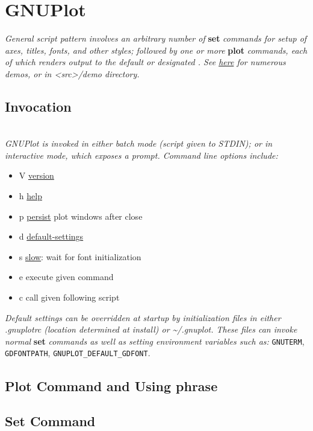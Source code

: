 \section{GNUPlot}
\textit{General script pattern involves an arbitrary number of }\textbf{set}\textit{ commands for setup of axes, titles, fonts, and other styles; followed by one or more }\textbf{plot}\textit{ commands, each of which renders output to the default or designated . See \href{http://gnuplot.info/demos/}{here} for numerous demos, or in <src>/demo directory.}


\subsection*{Invocation}
\\
\textit{GNUPlot is invoked in either batch mode (script given to STDIN); or in interactive mode, which exposes a prompt. Command line options include:}\
\begin{itemize}[label=-]
    \item V \quad \ul{version}
    \item h \quad \ul{help}
    \item p \quad \ul{persist} plot windows after close 
    \item d \quad \ul{default-settings}
    \item s \quad \ul{slow}: wait for font initialization
    \item e \quad execute given command
    \item c \quad call given following script
\end{itemize}
\textit{Default settings can be overridden at startup by initialization files in either .gnuplotrc (location determined at install) or \textasciitilde /.gnuplot. These files can invoke normal }\textbf{set}\textit{ commands as well as setting environment variables such as: } \texttt{GNUTERM}, \texttt{GDFONTPATH}, \texttt{GNUPLOT\_DEFAULT\_GDFONT}. \\


\subsection*{Plot Command and Using phrase}


\subsection*{Set Command}


